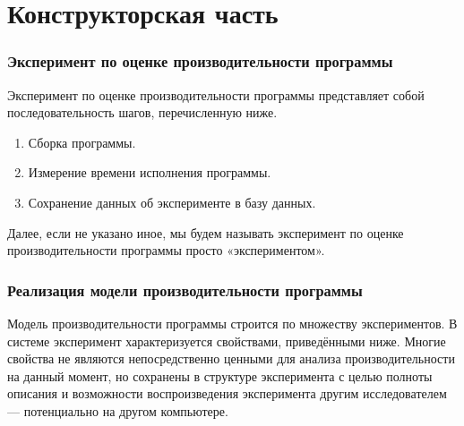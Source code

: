 \part{Конструкторская часть}

\section{Эксперимент по оценке производительности программы}

Эксперимент по оценке производительности программы представляет собой последовательность шагов, перечисленную ниже.

\begin{enumerate}
	\item Сборка программы.
	\item Измерение времени исполнения программы.
	\item Сохранение данных об эксперименте в базу данных.
\end{enumerate}

Далее, если не указано иное, мы будем называть эксперимент по оценке производительности программы просто «экспериментом».

\section{Реализация модели производительности программы}
\label{perf_mod_impl}

Модель производительности программы строится по множеству экспериментов. В системе эксперимент характеризуется свойствами, приведёнными ниже. Многие свойства не являются непосредственно ценными для анализа производительности на данный момент, но сохранены в структуре эксперимента с целью полноты описания и возможности воспроизведения эксперимента другим исследователем --- потенциально на другом компьютере.

